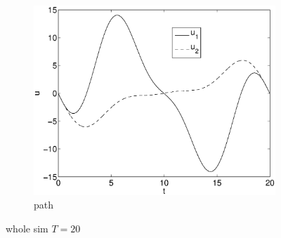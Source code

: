 \begin{figure}[h]
\begin{subfigure}[b]{\textwidth}
\centering
\includegraphics[height=0.3\textheight]{img/final_1_15_20_u.eps}
\caption{path}
\end{subfigure}
\caption{whole sim $T=20$}
\end{figure}

